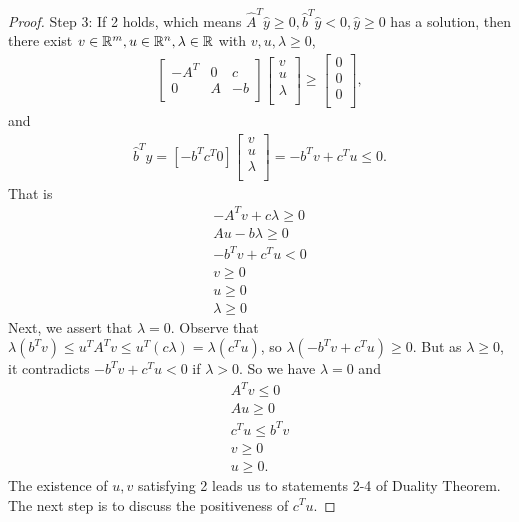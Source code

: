 \begin{proof}
Step 3:
If 2 holds, which means $\hat{A}^T \hat{y} \ge 0, \hat{b}^T \hat{y} < 0, \hat{y} \ge 0$ has a solution, then there exist $v \in \mathbb{R}^m, u \in \mathbb{R}^n, \lambda \in \mathbb{R}$ with $v, u, \lambda \ge 0$,
\begin{align}
\begin{bmatrix}
-A^T & 0 & c \\
0 & A & -b \\
\end{bmatrix}
\begin{bmatrix}
v \\
u \\
\lambda \\
\end{bmatrix}
\ge 
\begin{bmatrix}
0 \\
0 \\
0 \\
\end{bmatrix},
\end{align}
and 
\begin{align}
\hat{b}^T \hat{y} = [-b^T c^T 0] 
\begin{bmatrix}
v \\
u \\
\lambda \\
\end{bmatrix}
= -b^T v + c^T u \le 0.
\end{align}
That is
\begin{align}
-A^T v + c \lambda \ge 0 \\
A u - b \lambda \ge 0 \\
-b^T v + c^T u < 0\\
v \ge 0 \\
u \ge 0 \\ 
\lambda \ge 0 
\end{align}
Next, we assert that $\lambda = 0$.
Observe that $\lambda (b^T v) \le u^T A^T v \le u^T (c \lambda) = \lambda (c^T u)$, so $\lambda (-b^T v + c^T u) \ge 0$.
But as $\lambda \ge 0$, it contradicts $-b^T v + c^T u < 0$ if $\lambda > 0$.
So we have $\lambda = 0$ and 
\begin{align}
A^T v \le 0 \\
A u \ge 0 \\
c^T u \le b^T v \\
v \ge 0 \\
u \ge 0.
\end{align}
The existence of $u, v$ satisfying 2 leads us to statements 2-4 of Duality Theorem.
The next step is to discuss the positiveness of $c^T u$.


\end{proof}
